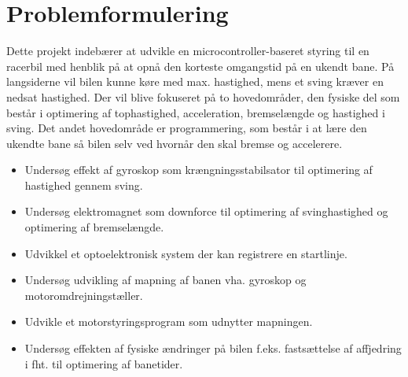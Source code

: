 
\section{Problemformulering}
Dette projekt indebærer at udvikle en microcontroller-baseret styring til en racerbil med henblik på at opnå den korteste omgangstid på en ukendt bane. På langsiderne vil bilen kunne køre med max. hastighed, mens et sving kræver en nedsat hastighed. Der vil blive fokuseret på to hovedområder, den fysiske del som består i optimering af tophastighed, acceleration, bremselængde og hastighed i sving. Det andet hovedområde er programmering, som består i at lære den ukendte bane så bilen selv ved hvornår den skal bremse og accelerere.
\begin{itemize}
\item Undersøg effekt af gyroskop som krængningsstabilsator til optimering af hastighed gennem sving.
\item Undersøg elektromagnet som downforce til optimering af svinghastighed og optimering af bremselængde.
\item Udvikkel et optoelektronisk system der kan registrere en startlinje.
\item Undersøg udvikling af mapning af banen vha. gyroskop og motoromdrejningstæller.
\item Udvikle et motorstyringsprogram som udnytter mapningen.
\item Undersøg effekten af fysiske ændringer på bilen f.eks. fastsættelse af affjedring i fht. til optimering af banetider.
\end{itemize}
